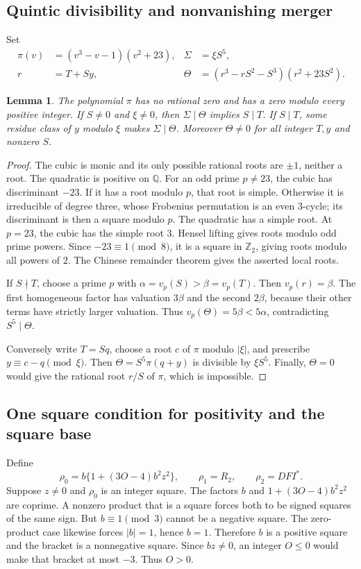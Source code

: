 \documentclass[11pt,a4paper]{article}
\newtheorem{lemma}[theorem]{Lemma}
\theoremstyle{remark}
\newcommand{\Z}{\mathbb Z}
\newcommand{\Qq}{\mathbb Q}
\begin{document}
\subsection{Quintic divisibility and nonvanishing merger}
Set
\begin{align}
\pi(v)&=(v^3-v-1)(v^2+23),&\Sigma&=\xi S^5,\nonumber\\
r&=T+Sy,&
\Theta&=(r^3-rS^2-S^3)(r^2+23S^2).\label{eq:quintic}
\end{align}
\begin{lemma}\label{lem:quintic}
The polynomial \(\pi\) has no rational zero and has a zero modulo
every positive integer. If \(S\ne0\) and \(\xi\ne0\), then
\(\Sigma\mid\Theta\) implies \(S\mid T\).
If \(S\mid T\), some residue class of \(y\) modulo \(\xi\)
makes \(\Sigma\mid\Theta\).
Moreover \(\Theta\ne0\) for all integer \(T,y\) and nonzero \(S\).
\end{lemma}
\begin{proof}
The cubic is monic and its only possible rational roots are
\(\pm1\), neither a root. The quadratic is positive on \(\Qq\).
For an odd prime \(p\ne23\), the cubic has discriminant \(-23\).
If it has a root modulo \(p\), that root is simple. Otherwise it is
irreducible of degree three, whose Frobenius permutation is an even
3-cycle; its discriminant is then a square modulo \(p\). The quadratic
has a simple root. At \(p=23\), the cubic has the simple root \(3\).
Hensel lifting gives roots modulo odd prime powers.
Since \(-23\equiv1\pmod8\), it is a square in \(\Z_2\), giving
roots modulo all powers of \(2\). The Chinese remainder theorem
gives the asserted local roots.

If \(S\nmid T\), choose a prime \(p\) with
\(\alpha=v_p(S)>\beta=v_p(T)\).
Then \(v_p(r)=\beta\). The first homogeneous factor has valuation
\(3\beta\) and the second \(2\beta\), because their other terms
have strictly larger valuation. Thus
\(v_p(\Theta)=5\beta<5\alpha\), contradicting \(S^5\mid\Theta\).

Conversely write \(T=Sq\), choose a root \(c\) of \(\pi\) modulo
\(|\xi|\), and prescribe \(y\equiv c-q\pmod{\xi}\).
Then \(\Theta=S^5\pi(q+y)\) is divisible by \(\xi S^5\).
Finally, \(\Theta=0\) would give the rational root \(r/S\) of
\(\pi\), which is impossible.
\end{proof}

\subsection{One square condition for positivity and the square base}
Define
\begin{equation}\label{eq:radicands}
\rho_0=b\{1+(3O-4)b^2z^2\},\qquad
\rho_1=R_2,\qquad \rho_2=DFI^*.
\end{equation}
Suppose \(z\ne0\) and \(\rho_0\) is an integer square.
The factors \(b\) and \(1+(3O-4)b^2z^2\) are coprime.
A nonzero product that is a square forces both to be signed squares
of the same sign. But \(b\equiv1\pmod3\) cannot be a negative square.
The zero-product case likewise forces \(|b|=1\), hence \(b=1\).
Therefore \(b\) is a positive square and the bracket is a
nonnegative square. Since \(bz\ne0\), an integer \(O\le0\)
would make that bracket at most \(-3\). Thus \(O>0\).
\end{document}
